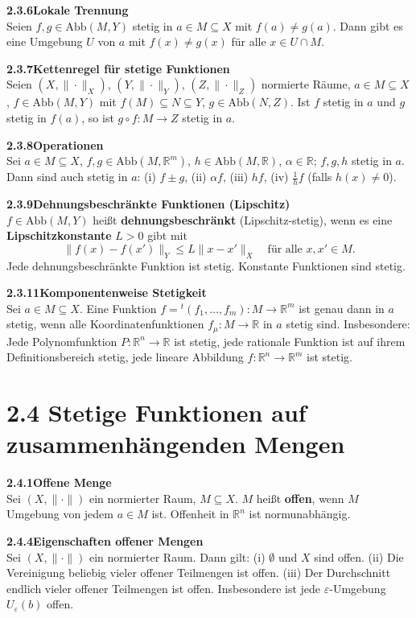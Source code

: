 \documentclass[a4paper,12pt]{article}
\newcommand{\gentry}[3]{%
  \noindent\textbf{#1\quad #2}\nopagebreak\\[0.2em]
  #3\par\smallskip
}
\begin{document}
\gentry{2.3.6}{Lokale Trennung}{%
  Seien $f, g \in \mathrm{Abb}(M, Y)$ stetig in $a \in M \subseteq X$ mit
  $f(a) \neq g(a)$. Dann gibt es eine Umgebung $U$ von $a$ mit
  $f(x) \neq g(x)$ für alle $x \in U \cap M$.
}

\gentry{2.3.7}{Kettenregel für stetige Funktionen}{%
  Seien $(X, \|\cdot\|_X)$, $(Y, \|\cdot\|_Y)$, $(Z, \|\cdot\|_Z)$ normierte Räume,
  $a \in M \subseteq X$, $f \in \mathrm{Abb}(M, Y)$ mit $f(M) \subseteq N \subseteq Y$,
  $g \in \mathrm{Abb}(N, Z)$. Ist $f$ stetig in $a$ und $g$ stetig in $f(a)$, so
  ist $g \circ f: M \to Z$ stetig in $a$.
}

\gentry{2.3.8}{Operationen}{%
  Sei $a \in M \subseteq X$, $f, g \in \mathrm{Abb}(M, \mathbb{R}^m)$,
  $h \in \mathrm{Abb}(M, \mathbb{R})$, $\alpha \in \mathbb{R}$; $f, g, h$ stetig in $a$.
  Dann sind auch stetig in $a$:
  (i) $f \pm g$, \quad (ii) $\alpha f$, \quad (iii) $hf$,
  \quad (iv) $\frac{1}{h} f$ (falls $h(x) \neq 0$).
}

\gentry{2.3.9}{Dehnungsbeschränkte Funktionen (Lipschitz)}{%
  $f \in \mathrm{Abb}(M, Y)$ heißt \textbf{dehnungsbeschränkt}
  (Lipschitz-stetig), wenn es eine \textbf{Lipschitzkonstante} $L > 0$ gibt mit
  \[
    \|f(x) - f(x')\|_Y \leq L \|x - x'\|_X \quad \text{für alle } x, x' \in M.
  \]
  Jede dehnungsbeschränkte Funktion ist stetig. Konstante Funktionen sind stetig.
}

\gentry{2.3.11}{Komponentenweise Stetigkeit}{%
  Sei $a \in M \subseteq X$. Eine Funktion $f = {}^t(f_1, \ldots, f_m): M \to \mathbb{R}^m$
  ist genau dann in $a$ stetig, wenn alle Koordinatenfunktionen
  $f_\mu: M \to \mathbb{R}$ in $a$ stetig sind.
  Insbesondere: Jede Polynomfunktion $P: \mathbb{R}^n \to \mathbb{R}$ ist stetig,
  jede rationale Funktion ist auf ihrem Definitionsbereich stetig, jede lineare
  Abbildung $f: \mathbb{R}^n \to \mathbb{R}^m$ ist stetig.
}

\section*{2.4 \quad Stetige Funktionen auf zusammenhängenden Mengen}

\gentry{2.4.1}{Offene Menge}{%
  Sei $(X, \|\cdot\|)$ ein normierter Raum, $M \subseteq X$. $M$ heißt
  \textbf{offen}, wenn $M$ Umgebung von jedem $a \in M$ ist.
  Offenheit in $\mathbb{R}^n$ ist normunabhängig.
}

\gentry{2.4.4}{Eigenschaften offener Mengen}{%
  Sei $(X, \|\cdot\|)$ ein normierter Raum. Dann gilt:
  (i) $\emptyset$ und $X$ sind offen.
  (ii) Die Vereinigung beliebig vieler offener Teilmengen ist offen.
  (iii) Der Durchschnitt endlich vieler offener Teilmengen ist offen.
  Insbesondere ist jede $\varepsilon$-Umgebung $U_\varepsilon(b)$ offen.
}
\end{document}
